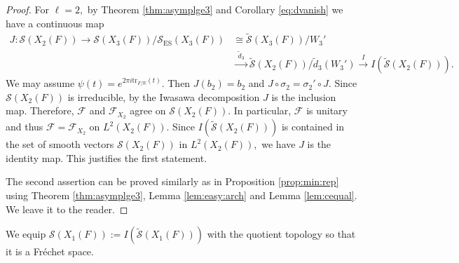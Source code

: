 \documentclass[11pt,a4paper,reqno]{amsart}
\theoremstyle{remark}
\numberwithin{equation}{section}
\newcommand{\RR}{\mathbb{R}}
\theoremstyle{definition}
\numberwithin{equation}{section}
\begin{document}
\begin{proof}
    For $\ell=2,$ by Theorem \ref{thm:asymplge3} and Corollary \ref{eq:dvanish} we have a continuous map
    \begin{align*}
        J:\mathcal{S}(X_{2}(F))\longrightarrow \mathcal{S}(X_{3}(F))/\mathcal{S}_{\mathrm{ES}}(X_{3}(F)) &\cong \widetilde{\mathcal{S}}(X_{3}(F))/W_3'\\
        &\xrightarrow{\,\,\tilde{d}_3\,\,} \widetilde{\mathcal{S}}(X_{2}(F))/\tilde{d}_3(W_3')\xrightarrow{\,\,I\,\,} I(\widetilde{\mathcal{S}}(X_{2}(F))). 
    \end{align*}
    We may assume $\psi(t)=e^{2\pi i\mathrm{tr}_{F/\RR}(t)}.$ Then $J(b_2)=b_2$ and $J\circ \sigma_2=\sigma_2'\circ J$. Since $\mathcal{S}(X_{2}(F))$ is irreducible, by the Iwasawa decomposition $J$ is the inclusion map. Therefore, $\mathcal{F}$ and $\mathcal{F}_{X_{2}}$ agree on $\mathcal{S}(X_{2}(F))$. In particular, $\mathcal{F}$ is unitary and thus $\mathcal{F}=\mathcal{F}_{X_{2}}$ on $L^2(X_{2}(F)).$ Since $I(\widetilde{\mathcal{S}}(X_{2}(F)))$ is contained in the set of smooth vectors $\mathcal{S}(X_{2}(F))$ in $L^2(X_{2}(F)),$ we have $J$ is the identity map. This justifies the first statement.

    The second assertion can be proved similarly as in  Proposition \ref{prop:min:rep} using Theorem \ref{thm:asymplge3}, Lemma \ref{lem:easy:arch} and Lemma \ref{lem:cequal}. We leave it to the reader.
\end{proof}

We equip $\mathcal{S}(X_{1}(F)):=I(\widetilde{\mathcal{S}}(X_1(F)))$ with the quotient topology so that it is a Fr\'echet space.
\end{document}
